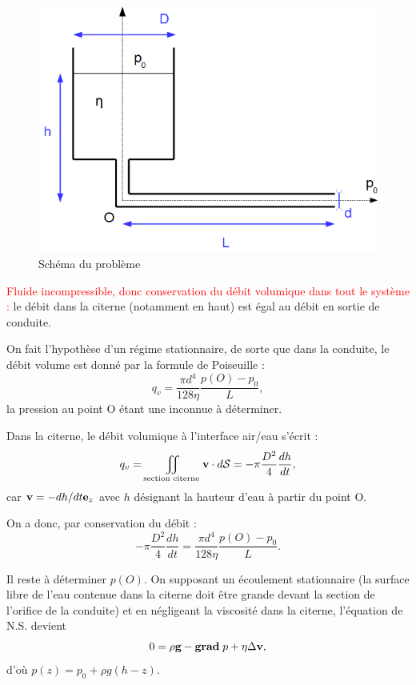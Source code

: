 \documentclass[11pt,a4paper]{report}
\begin{document}
\begin{figure}[h!]
\begin{center}
	\includegraphics[scale = 0.4]{visco_poise.png}
	\caption{Schéma du problème} 
	\label{fig:visco_poise}
\end{center}
\end{figure}

\textcolor{red}{Fluide incompressible, donc conservation du débit volumique dans tout le système :}
le débit dans la citerne (notamment en haut) est égal au débit en sortie de conduite. 

On fait l'hypothèse d'un régime stationnaire, de sorte que dans la conduite, le débit volume est donné par la formule de Poiseuille :
\begin{equation}
	q_v = \frac{\pi d^4}{128\eta}\frac{p(O) -p_0}{L},
\end{equation}
la pression au point O étant une inconnue à déterminer.

Dans la citerne, le débit volumique à l'interface air/eau s'écrit :
\begin{equation}
	q_v = \iint_{\text{section citerne}}\bold{v}\cdot d\bold{\mathcal{S}} = -\pi\frac{D^2}{4}\frac{dh}{dt},
\end{equation}
car $\bold{v} = -dh/dt \bold{e}_z$ avec $h$ désignant la hauteur d'eau à partir du point O.

On a donc, par conservation du débit :
\begin{equation}
	-\pi\frac{D^2}{4}\frac{dh}{dt} = \frac{\pi d^4}{128\eta}\frac{p(O) -p_0}{L}.
\end{equation}

Il reste à déterminer $p(O)$. On supposant un écoulement stationnaire (la surface libre de l'eau contenue dans la citerne doit être grande devant la section de l'orifice de la conduite) et en négligeant la viscosité dans la citerne, l'équation de N.S. devient
\begin{equation}
 	0 = \rho \bold{g} - \textbf{grad}\;p + \eta\Delta{\bold{v}},
\end{equation}
d'où $p(z) = p_0 + \rho g(h-z)$.\\
\end{document}

